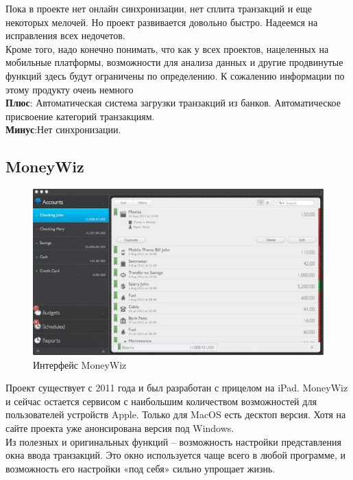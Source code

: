Пока в проекте нет онлайн синхронизации, нет сплита транзакций и еще некоторых мелочей. Но проект развивается довольно быстро. Надеемся на исправления всех недочетов.\\

Кроме того, надо конечно понимать, что как у всех проектов, нацеленных на мобильные платформы, возможности для анализа данных и другие продвинутые функций здесь будут ограничены по определению. К сожалению информации по этому продукту очень немного\\
\textbf{Плюс}: Автоматическая система загрузки транзакций из банков. Автоматическое присвоение категорий транзакциям.
\\
\textbf{Минус}:Нет синхронизации.\\

\subsection{MoneyWiz}
\begin{figure}[H]
	\centering
	\includegraphics[width=1\linewidth]{pics/MoneyWiz.eps}
	\caption{Интерфейс MoneyWiz}
	\label{fig:MoneyWiz}
\end{figure}
Проект существует с 2011 года и был разработан с прицелом на iPad. MoneyWiz и сейчас остается сервисом с наибольшим количеством возможностей для пользователей устройств Apple. Только для MacOS есть десктоп версия. Хотя на сайте проекта уже анонсирована версия под Windows.\\

Из полезных и оригинальных функций – возможность настройки представления окна ввода транзакций. Это окно используется чаще всего в любой программе, и возможность его настройки «под себя» сильно упрощает жизнь.\\

